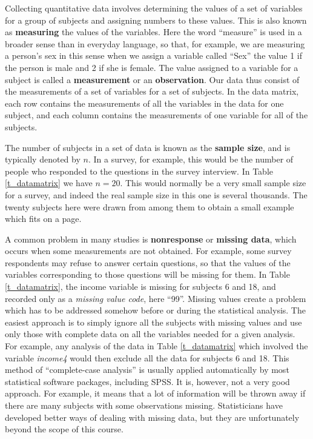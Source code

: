 \vspace*{-2ex}
Collecting quantitative data involves determining the values of a set of
variables for a group of subjects and assigning numbers to these values.
This is also known as \textbf{measuring} the values of the
variables. Here the word ``measure'' is used in a broader sense than in
everyday language, so that, for example, we are measuring a person's sex
in this sense when we assign a variable called ``Sex'' the value 1 if
the person is male and 2 if she is female. The value assigned to a
variable for a subject is called a \textbf{measurement} or an
\textbf{observation}. Our data thus consist of the measurements of a
set of variables for a set of subjects. In the data matrix, each row
contains the measurements of all the variables in the data for one
subject, and each column contains the measurements of one variable for
all of the subjects.

The number of subjects in a set of data is known as the \textbf{sample
size}, and is typically denoted by $n$. In a survey, for example,
this would be the number of people who responded to the questions in the
survey interview. In Table \ref{t_datamatrix} we have $n=20$. This would normally
be a very small sample size for a survey, and indeed the real
sample size in this one is several thousands. The twenty subjects here
were drawn from among them to obtain a small example which fits on a page.

A common problem in many studies is \textbf{nonresponse} or
\textbf{missing data}, which occurs when some measurements are not
obtained. For example, some survey respondents may refuse to answer
certain questions, so that the values of the variables corresponding to
those questions will be missing for them. In Table \ref{t_datamatrix},
the income variable is missing for subjects 6 and 18, and recorded only
as a \emph{missing value code}, here ``99''. Missing values create a
problem which has to be addressed somehow before or during the
statistical analysis. The easiest approach is to simply ignore all the
subjects with missing values and use only those with complete data on
all the variables needed for a given analysis.
For example, any analysis of the data in Table \ref{t_datamatrix} which
involved the variable \emph{income4} would then
exclude all the data for subjects 6 and 18. This method of
``complete-case analysis'' is usually applied
automatically by most statistical software packages, including SPSS. It
is, however, not a very good approach. For example, it means that a lot
of information will be thrown away if there are many subjects with some
observations missing. Statisticians have developed better ways of
dealing with missing data, but they are unfortunately beyond the scope
of this course.

